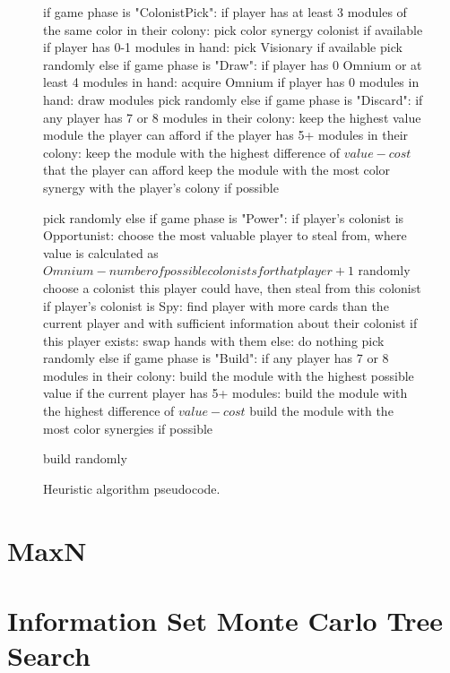 \begin{figure}[h!]
\begin{code}[commandchars=\\\{\},codes={\catcode`\$=3\catcode`\^=7\catcode`\_=8}]
if game phase is "ColonistPick":
    if player has at least 3 modules of the same color in their colony:
        pick color synergy colonist if available
    if player has 0-1 modules in hand:
        pick Visionary if available
    pick randomly
else if game phase is "Draw":
    if player has 0 Omnium or at least 4 modules in hand:
        acquire Omnium
    if player has 0 modules in hand:
        draw modules
    pick randomly
else if game phase is "Discard":
    if any player has 7 or 8 modules in their colony:
        keep the highest value module the player can afford
    if the player has 5+ modules in their colony:
        keep the module with the highest difference of $value - cost$
        that the player can afford
    keep the module with the most color synergy with the player's
    colony if possible

    pick randomly
else if game phase is "Power":
    if player's colonist is Opportunist:
        choose the most valuable player to steal from,
        where value is calculated as
        $Omnium - number of possible colonists for that player + 1$
        randomly choose a colonist this player could have,
        then steal from this colonist
    if player's colonist is Spy:
        find player with more cards than the current player
        and with sufficient information about their colonist
        if this player exists:
            swap hands with them
        else:
            do nothing
    pick randomly
else if game phase is "Build":
    if any player has 7 or 8 modules in their colony:
        build the module with the highest possible value
    if the current player has 5+ modules:
        build the module with the highest difference of $value - cost$
    build the module with the most color synergies if possible

    build randomly
\end{code}
\caption{Heuristic algorithm pseudocode.}\label{algo:heur}
\end{figure}

\clearpage
\section{MaxN}
\label{sec:algomaxn}

\section{Information Set Monte Carlo Tree Search}

